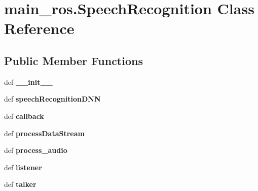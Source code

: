 \hypertarget{classmain__ros_1_1SpeechRecognition}{\section{main\-\_\-ros.\-Speech\-Recognition Class Reference}
\label{classmain__ros_1_1SpeechRecognition}
}
\subsection*{Public Member Functions}
\begin{DoxyCompactItemize}
\item 
\hypertarget{classmain__ros_1_1SpeechRecognition_a63aaae87ab47b5e42bcc6051486f158c}{def {\bfseries \-\_\-\-\_\-init\-\_\-\-\_\-}}\label{classmain__ros_1_1SpeechRecognition_a63aaae87ab47b5e42bcc6051486f158c}

\item 
\hypertarget{classmain__ros_1_1SpeechRecognition_a9983cec7cf994263a15cb69a0d41c9c2}{def {\bfseries speech\-Recognition\-D\-N\-N}}\label{classmain__ros_1_1SpeechRecognition_a9983cec7cf994263a15cb69a0d41c9c2}

\item 
\hypertarget{classmain__ros_1_1SpeechRecognition_ac7e5524cd2cd1278c8b5aaba42900c57}{def {\bfseries callback}}\label{classmain__ros_1_1SpeechRecognition_ac7e5524cd2cd1278c8b5aaba42900c57}

\item 
\hypertarget{classmain__ros_1_1SpeechRecognition_a092b211b460b71240690021aec113597}{def {\bfseries process\-Data\-Stream}}\label{classmain__ros_1_1SpeechRecognition_a092b211b460b71240690021aec113597}

\item 
\hypertarget{classmain__ros_1_1SpeechRecognition_aff66f9c3e822b11c2b9149031d78f582}{def {\bfseries process\-\_\-audio}}\label{classmain__ros_1_1SpeechRecognition_aff66f9c3e822b11c2b9149031d78f582}

\item 
\hypertarget{classmain__ros_1_1SpeechRecognition_a52baec98ba4e562fb7a3c0dad36de7c5}{def {\bfseries listener}}\label{classmain__ros_1_1SpeechRecognition_a52baec98ba4e562fb7a3c0dad36de7c5}

\item 
\hypertarget{classmain__ros_1_1SpeechRecognition_a4086b9947a46bb7fc3248e7ce1dd2b74}{def {\bfseries talker}}\label{classmain__ros_1_1SpeechRecognition_a4086b9947a46bb7fc3248e7ce1dd2b74}


\end{DoxyCompactItemize}
